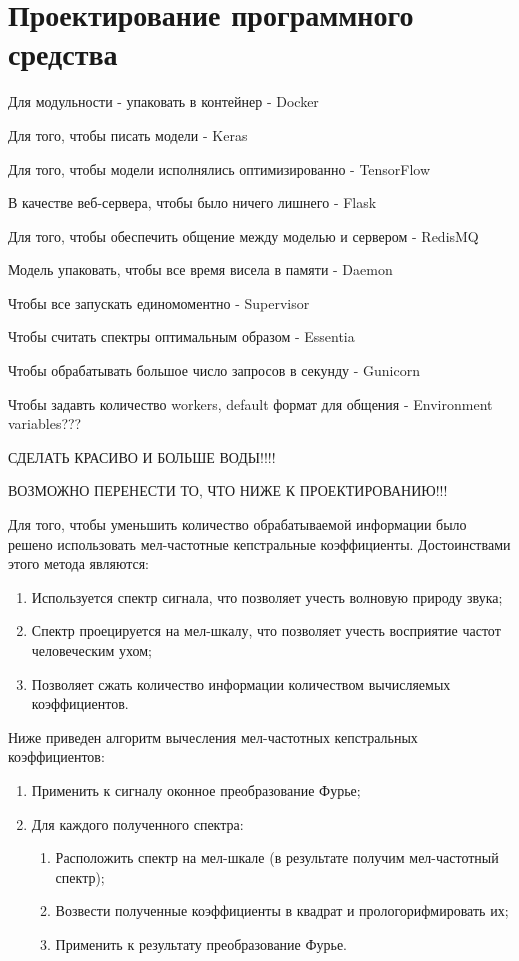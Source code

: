\section{Проектирование программного средства}
\label{sec:design}

Для модульности - упаковать в контейнер - Docker

Для того, чтобы писать модели - Keras

Для того, чтобы модели исполнялись оптимизированно - TensorFlow

В качестве веб-сервера, чтобы было ничего лишнего - Flask

Для того, чтобы обеспечить общение между моделью и сервером - RedisMQ

Модель упаковать, чтобы все время висела в памяти - Daemon

Чтобы все запускать единомоментно - Supervisor

Чтобы считать спектры оптимальным образом - Essentia

Чтобы обрабатывать большое число запросов в секунду - Gunicorn

Чтобы задавть количество workers, default формат для общения - Environment variables???

СДЕЛАТЬ КРАСИВО И БОЛЬШЕ ВОДЫ!!!!

ВОЗМОЖНО ПЕРЕНЕСТИ ТО, ЧТО НИЖЕ К ПРОЕКТИРОВАНИЮ!!!

Для того, чтобы уменьшить количество обрабатываемой информации было решено использовать мел-частотные кепстральные коэффициенты. Достоинствами этого метода являются:
\begin{enumerate}
  \item Используется спектр сигнала, что позволяет учесть волновую природу звука;
  \item Спектр проецируется на мел-шкалу, что позволяет учесть восприятие частот человеческим ухом;
  \item Позволяет сжать количество информации количеством вычисляемых коэффициентов.
\end{enumerate}

Ниже приведен алгоритм вычесления мел-частотных кепстральных коэффициентов:
\begin{enumerate}
  \item Применить к сигналу оконное преобразование Фурье;
  \item Для каждого полученного спектра:
    \begin{enumerate}
      \item Расположить спектр на мел-шкале (в результате получим мел-частотный спектр);
      \item Возвести полученные коэффициенты в квадрат и прологорифмировать их;
      \item Применить к результату преобразование Фурье.
    \end{enumerate}
\end{enumerate}
